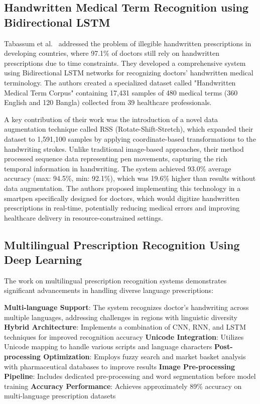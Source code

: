 \documentclass[twocolumn,10pt]{article}
\begin{document}
\subsection{Handwritten Medical Term Recognition using Bidirectional LSTM}


Tabassum et al.~\cite{tabassum2022online} addressed the problem of illegible handwritten prescriptions in developing countries, where 97.1\% of doctors still rely on handwritten prescriptions due to time constraints. They developed a comprehensive system using Bidirectional LSTM networks for recognizing doctors' handwritten medical terminology. The authors created a specialized dataset called "Handwritten Medical Term Corpus" containing 17,431 samples of 480 medical terms (360 English and 120 Bangla) collected from 39 healthcare professionals. 

A key contribution of their work was the introduction of a novel data augmentation technique called RSS (Rotate-Shift-Stretch), which expanded their dataset to 1,591,100 samples by applying coordinate-based transformations to the handwriting strokes. Unlike traditional image-based approaches, their method processed sequence data representing pen movements, capturing the rich temporal information in handwriting. The system achieved 93.0\% average accuracy (max: 94.5\%, min: 92.1\%), which was 19.6\% higher than results without data augmentation. The authors proposed implementing this technology in a smartpen specifically designed for doctors, which would digitize handwritten prescriptions in real-time, potentially reducing medical errors and improving healthcare delivery in resource-constrained settings.

\subsection{Multilingual Prescription Recognition Using Deep Learning}

The work on multilingual prescription recognition systems demonstrates significant advancements in handling diverse language prescriptions:


    \textbf{Multi-language Support}: The system recognizes doctor's handwriting across multiple languages, addressing challenges in regions with linguistic diversity~\cite{pavithiran2024multilingual}
    \textbf{Hybrid Architecture}: Implements a combination of CNN, RNN, and LSTM techniques for improved recognition accuracy
    \textbf{Unicode Integration}: Utilizes Unicode mapping to handle various scripts and language characters
     \textbf{Post-processing Optimization}: Employs fuzzy search and market basket analysis with pharmaceutical databases to improve results
     \textbf{Image Pre-processing Pipeline}: Includes dedicated pre-processing and word segmentation before model training
     \textbf{Accuracy Performance}: Achieves approximately 89\% accuracy on multi-language prescription datasets
\end{document}
